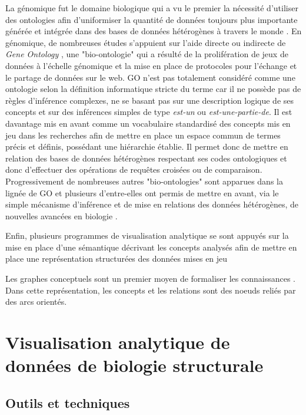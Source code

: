 La génomique fut le domaine biologique qui a vu le premier la nécessité d'utiliser des ontologies afin d'uniformiser la quantité de données toujours plus importante générée et intégrée dans des bases de données hétérogènes à travers le monde \cite{schuurman_ontologies_2008}.
En génomique, de nombreuses études s'appuient sur l'aide directe ou indirecte de \textit{Gene Ontology} \cite{ashburner_gene_2000}, une "bio-ontologie" qui a résulté de la prolifération de jeux de données à l'échelle génomique et la mise en place de protocoles pour l'échange et le partage de données sur le web. GO n'est pas totalement considéré comme une ontologie selon la définition informatique stricte du terme car il ne possède pas de règles d'inférence complexes, ne se basant pas sur une description logique de ses concepts et sur des inférences simples de type \textit{est-un} ou \textit{est-une-partie-de}. Il est davantage mis en avant comme un vocabulaire standardisé des concepts mis en jeu dans les recherches afin de mettre en place un espace commun de termes précis et définis, possédant une hiérarchie établie. Il permet donc de mettre en relation des bases de données hétérogènes respectant ses codes ontologiques et donc d'effectuer des opérations de requêtes croisées ou de comparaison. Progressivement de nombreuses autres "bio-ontologies" sont apparues dans la lignée de GO et plusieurs d'entre-elles ont permis de mettre en avant, via le simple mécanisme d'inférence et de mise en relations des données hétérogènes, de nouvelles avancées en biologie \cite{yoshikawa_drug_2004, stenzhorn_biotop_2008, smith_obo_2007}.

Enfin, plusieurs programmes de visualisation analytique se sont appuyés sur la mise en place d'une sémantique décrivant les concepts analysés afin de mettre en place une représentation structurées des données mises en jeu 

Les graphes conceptuels sont un premier moyen de formaliser les connaissances \cite{chein2008graph}. Dans cette représentation, les concepts et les relations sont des noeuds reliés par des arcs orientés.

\section{Visualisation analytique de données de biologie structurale}
\label{Sec:visuAnalyticsStructBio}

\subsection{Outils et techniques}

